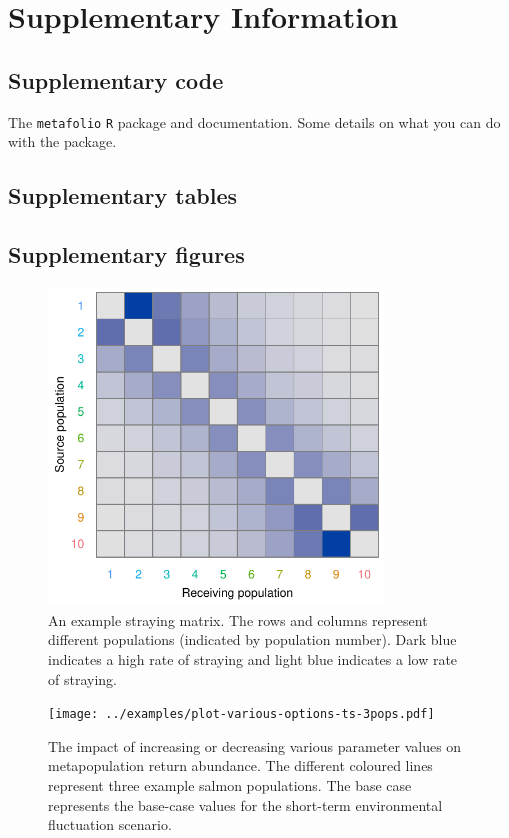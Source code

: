 \section{Supplementary Information}

\subsection{Supplementary code}

The \texttt{metafolio} \texttt{R} package and documentation. Some
details on what you can do with the package.

\subsection{Supplementary tables}



\subsection{Supplementary figures}

\begin{figure}[htbp]
\centering
\includegraphics[width=3.5in]{../examples/figure/stray-matrix.pdf}
\caption{An example straying matrix. The rows and columns represent different 
populations (indicated by population number). Dark blue indicates a high rate 
of straying and light blue indicates a low rate of straying.}
\label{f:stray}
\end{figure}

\clearpage

\begin{figure}[htbp]
\centering
\texttt{[image: ../examples/plot-various-options-ts-3pops.pdf]}
\caption{The impact of increasing or decreasing various parameter values on metapopulation return abundance. The different coloured lines represent three example salmon populations. The base case represents the base-case values for the short-term environmental fluctuation scenario.}
\label{f:eg-sens}
\end{figure}

